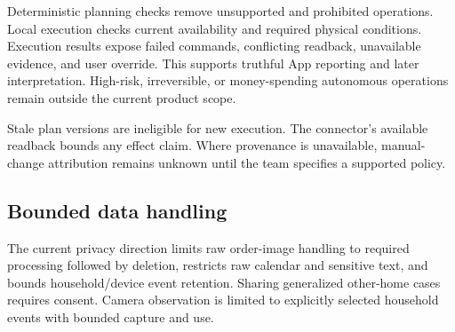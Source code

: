 Deterministic planning checks remove unsupported and prohibited operations. Local execution checks current availability and required physical conditions. Execution results expose failed commands, conflicting readback, unavailable evidence, and user override. This supports truthful App reporting and later interpretation. High-risk, irreversible, or money-spending autonomous operations remain outside the current product scope. 

Stale plan versions are ineligible for new execution. The connector's available readback bounds any effect claim. Where provenance is unavailable, manual-change attribution remains unknown until the team specifies a supported policy. 

\subsection{Bounded data handling}

The current privacy direction limits raw order-image handling to required processing followed by deletion, restricts raw calendar and sensitive text, and bounds household/device event retention. Sharing generalized other-home cases requires consent. Camera observation is limited to explicitly selected household events with bounded capture and use. 


